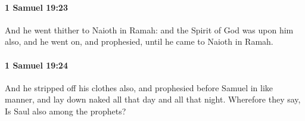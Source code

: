 		\paragraph{1 Samuel 19:23} %
			\label{1SAMUEL-19-23}

			And he went thither to Naioth in Ramah: and the Spirit of God was upon him also, and he went on, and prophesied, until he came to Naioth in Ramah.


		\paragraph{1 Samuel 19:24} %
			\label{1SAMUEL-19-24}

			And he stripped off his clothes also, and prophesied before Samuel in like manner, and lay down naked all that day and all that night. Wherefore they say, Is Saul also among the prophets?


